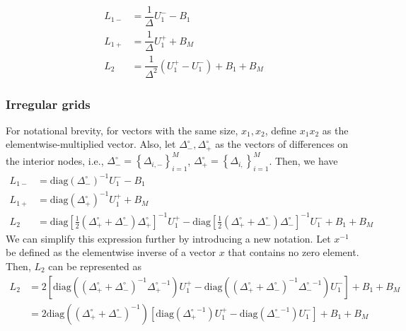 \documentclass[11pt]{article}
\newcommand{\set}[1]{\ensuremath{\left\{{#1}\right\}}}
\theoremstyle{definition}
\begin{document}
\begin{align}
L_{1-} &= \dfrac{1}{\Delta} U_1^{-} - B_1 \\
L_{1+} &= \dfrac{1}{\Delta} U_1^{+} + B_{M} \\
L_2 &= \dfrac{1}{\Delta^2} (U_1^+ - U_1^-) + B_1 + B_{M}
\end{align}

\subsubsection{Irregular grids}
For notational brevity, for vectors with the same size, $x_1, x_2$, define $x_1 x_2$ as the elementwise-multiplied vector. Also, let $\Delta_-^\circ, \Delta_+^\circ$ as the vectors of differences on the interior nodes, i.e., $\Delta_{-}^\circ = \set{\Delta_{i,-}}_{i=1}^M$, $\Delta_{+}^\circ = \set{\Delta_{i,}}_{i=1}^M$. Then, we have
\begin{align}
L_{1-} &= \text{diag}(\Delta_{-}^{\circ} )^{-1} U_1^{-} - B_1 \\
L_{1+} &= \text{diag}(\Delta_{+}^{\circ} )^{-1} U_1^{+} + B_{M} \\
L_2 &= \text{diag} \left[ \frac{1}{2} ( {\Delta_{+}^{\circ}} + {\Delta_{-}^{\circ}} ) {\Delta_{+}^{\circ}} \right]^{-1}  U_1^{+} -
\text{diag} \left[ \frac{1}{2} ( {\Delta_{+}^{\circ}} + {\Delta_{-}^{\circ}} ) {\Delta_{-}^{\circ}} \right]^{-1}  U_1^{-}
+ B_1 + B_{M}
\end{align}
We can simplify this expression further by introducing a new notation. Let $x^{-1}$ be defined as the elementwise inverse of a vector $x$ that contains no zero element. Then, $L_2$ can be represented as
\begin{align}
L_2 &=
2\left[ \text{diag} \left( ( {\Delta_{+}^{\circ}} + {\Delta_{-}^{\circ}} )^{-1} {\Delta_{+}^{\circ}}^{-1} \right) U_1^{+} -
\text{diag} \left( ( {\Delta_{+}^{\circ}} + {\Delta_{-}^{\circ}} )^{-1} {\Delta_{-}^{\circ}}^{-1} \right) U_1^{-}  \right]
+ B_1 + B_{M} \\ \label{eq:L-2-by-basis}
&= 2 \text{diag} \left( ( {\Delta_{+}^{\circ}} + {\Delta_{-}^{\circ}} )^{-1} \right) \left[ \text{diag} \left(  {\Delta_{+}^{\circ}}^{-1} \right) U_1^{+} -
\text{diag} \left(  {\Delta_{-}^{\circ}}^{-1} \right) U_1^{-}  \right]
+ B_1 + B_{M}
\end{align}
\end{document}
